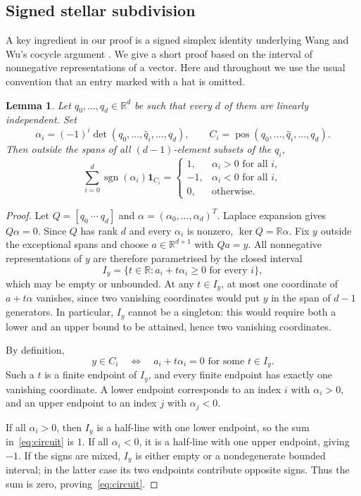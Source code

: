 \documentclass[11pt]{article}
\newcommand{\R}{\mathbb{R}}
\newcommand{\pos}{\operatorname{pos}}
\newcommand{\sgn}{\operatorname{sgn}}
\theoremstyle{plain}
\newtheorem{lemma}[theorem]{Lemma}
\theoremstyle{definition}
\begin{document}
\subsection{Signed stellar subdivision}

A key ingredient in our proof is a signed simplex identity underlying Wang and Wu's cocycle argument
\cite[Lemma~6.2]{WangWu:Spherical-Hadwiger}. We give a short proof based on
the interval of nonnegative representations of a vector.
Here and throughout we use the usual convention that an entry marked with a hat is omitted.

\begin{lemma}\label{lem:circuit}
Let $q_0,\ldots,q_d\in\R^d$ be such that every $d$ of them are linearly
independent. Set
\[
  \alpha_i=(-1)^i\det(q_0,\ldots,\widehat q_i,\ldots,q_d),
  \qquad C_i=\pos(q_0,\ldots,\widehat q_i,\ldots,q_d).
\]
Then outside the spans of
all $(d-1)$-element subsets of the $q_i$,
\begin{equation}\label{eq:circuit}
  \sum_{i=0}^d\sgn(\alpha_i)\mathbf1_{C_i}=
  \begin{cases}
    1,&\alpha_i>0\text{ for all }i,\\
    -1,&\alpha_i<0\text{ for all }i,\\
    0,&\text{otherwise}.
  \end{cases}
\end{equation}
\end{lemma}

\begin{proof}
Let $Q=[q_0\ \cdots\ q_d]$ and $\alpha=(\alpha_0,\ldots,\alpha_d)^T$.
Laplace expansion gives $Q\alpha=0$.  Since $Q$ has rank $d$ and
every $\alpha_i$ is nonzero, $\ker Q=\R\alpha$.
Fix $y$ outside the exceptional spans and choose $a\in\R^{d+1}$ with
$Qa=y$.  All nonnegative representations of $y$ are therefore
parametrised by the closed interval
\[
  I_y=\{t\in\R:a_i+t\alpha_i\ge0\text{ for every }i\},
\]
which may be empty or unbounded.  At any $t\in I_y$, at most one
coordinate of $a+t\alpha$ vanishes, since two vanishing coordinates
would put $y$ in the span of $d-1$ generators.  In particular, $I_y$
cannot be a singleton: this would require both a lower and an upper
bound to be attained, hence two vanishing coordinates.

By definition,
\[
  y\in C_i\quad\Longleftrightarrow\quad
  a_i+t\alpha_i=0\text{ for some }t\in I_y.
\]
Such a $t$ is a finite endpoint of $I_y$, and every finite endpoint
has exactly one vanishing coordinate.  A lower endpoint corresponds
to an index $i$ with $\alpha_i>0$, and an upper endpoint to an index
$j$ with $\alpha_j<0$.

If all $\alpha_i>0$, then $I_y$ is a half-line with one lower endpoint,
so the sum in~\eqref{eq:circuit} is $1$.  If all $\alpha_i<0$, it is
a half-line with one upper endpoint, giving $-1$.  If the signs are
mixed, $I_y$ is either empty or a nondegenerate bounded interval;
in the latter case its two endpoints contribute opposite signs.
Thus the sum is zero, proving~\eqref{eq:circuit}.
\end{proof}
\end{document}
